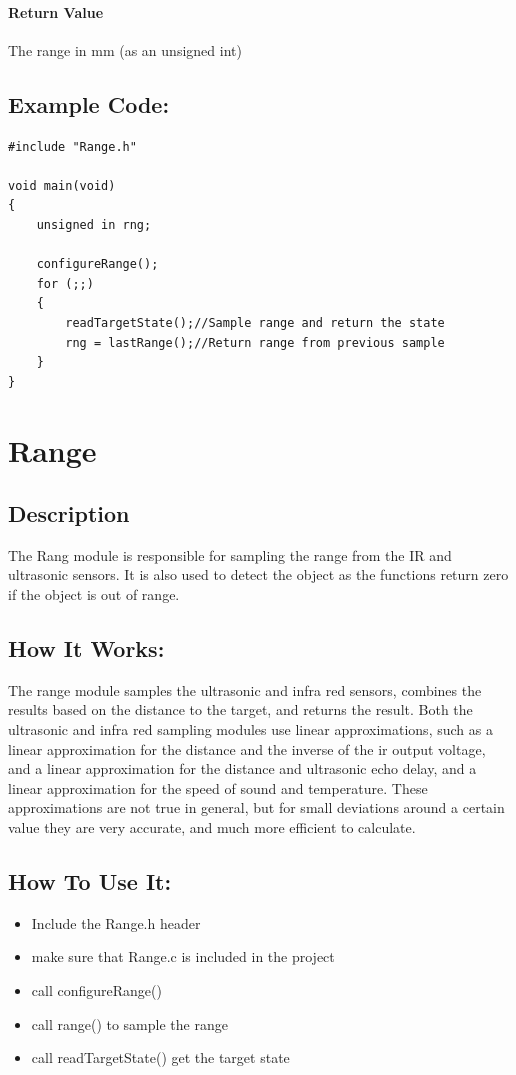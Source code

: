 \documentclass[]{report}
\begin{document}
\subsubsection{Return Value}
The range in mm (as an unsigned int)

\section{Example Code:}
\begin{lstlisting}
#include "Range.h"

void main(void)
{
	unsigned in rng;
	
	configureRange();
	for (;;) 
	{
		readTargetState();//Sample range and return the state
		rng = lastRange();//Return range from previous sample
	}
}
\end{lstlisting}\chapter{Range}
\section{Description}
The Rang module is responsible for sampling the range from the IR and ultrasonic sensors. It is also used to detect the object as the functions return zero if the object is out of range.

\section{How It Works:}
The range module samples the ultrasonic and infra red sensors, combines the results based on the distance to the target, and returns the result. Both the ultrasonic and infra red sampling modules use linear approximations, such as a linear approximation for the distance and the inverse of the ir output voltage, and a linear approximation for the distance and ultrasonic echo delay, and a linear approximation for the speed of sound and temperature. These approximations are not true in general, but for small deviations around a certain value they are very accurate, and much more efficient to calculate.

\section{How To Use It:}
\begin{itemize}
	\item Include the Range.h header
	\item make sure that Range.c is included in the project
	\item call configureRange()
	\item call range() to sample the range
	\item call readTargetState() get the target state
\end{itemize}
\end{document}
